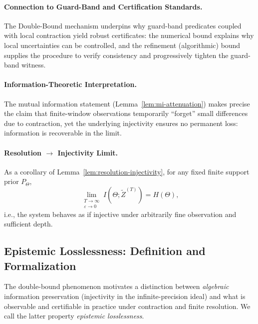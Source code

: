 \documentclass[12pt]{article}
\theoremstyle{definition}
\theoremstyle{plain}
\begin{document}
\paragraph{Connection to Guard-Band and Certification Standards.} The Double-Bound mechanism underpins why guard-band predicates coupled with local contraction yield robust certificates: the numerical bound explains why local uncertainties can be controlled, and the refinement (algorithmic) bound supplies the procedure to verify consistency and progressively tighten the guard-band witness.

\paragraph{Information-Theoretic Interpretation.} The mutual information statement (Lemma~\ref{lem:mi-attenuation}) makes precise the claim that finite-window observations temporarily ``forget'' small differences due to contraction, yet the underlying injectivity ensures no permanent loss: information is recoverable in the limit.

\paragraph{Resolution \(\to\) Injectivity Limit.} As a corollary of Lemma~\ref{lem:resolution-injectivity}, for any fixed finite support prior \(P_\Theta\),  
\[
\lim_{\substack{T\to\infty\\ \varepsilon\to 0}} I(\Theta;\widetilde Z^{(T)}) = H(\Theta),
\]
i.e., the system behaves as if injective under arbitrarily fine observation and sufficient depth.



\subsection{Epistemic Losslessness: Definition and Formalization}

The double-bound phenomenon motivates a distinction between \emph{algebraic} information preservation (injectivity in the infinite-precision ideal) and what is observable and certifiable in practice under contraction and finite resolution. We call the latter property \emph{epistemic losslessness}.
\end{document}
